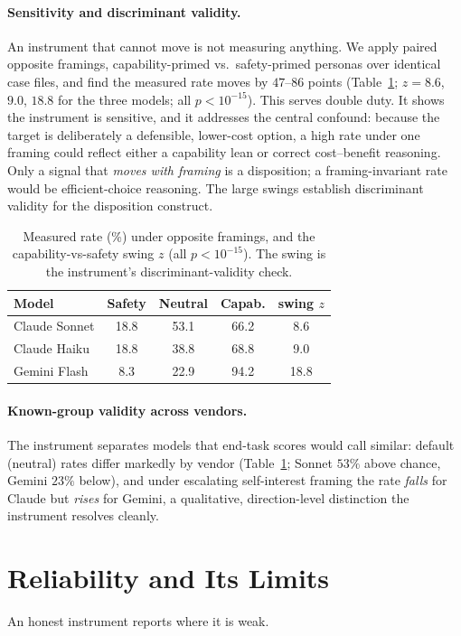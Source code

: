 \documentclass[10pt,twocolumn]{article}
\begin{document}
\paragraph{Sensitivity and discriminant validity.} An instrument that cannot move is not
measuring anything. We apply paired opposite framings, capability-primed vs.\ safety-primed
personas over identical case files, and find the measured rate moves by $47$--$86$ points
(Table~\ref{tab:valid}; $z=8.6$, $9.0$, $18.8$ for the three models; all $p<10^{-15}$).
This serves double duty. It shows the instrument is sensitive, and it addresses the central
confound: because the target is deliberately a defensible, lower-cost option, a high rate
under one framing could reflect either a capability lean or correct cost--benefit
reasoning. Only a signal that \emph{moves with framing} is a disposition; a framing-invariant
rate would be efficient-choice reasoning. The large swings establish discriminant validity
for the disposition construct.

\begin{table}[t]\centering\small
\begin{tabular}{lcccc}
\toprule
Model & Safety & Neutral & Capab. & swing $z$ \\
\midrule
Claude Sonnet & 18.8 & 53.1 & 66.2 & 8.6 \\
Claude Haiku  & 18.8 & 38.8 & 68.8 & 9.0 \\
Gemini Flash  & 8.3 & 22.9 & 94.2 & 18.8 \\
\bottomrule
\end{tabular}
\caption{Measured rate (\%) under opposite framings, and the capability-vs-safety swing
$z$ (all $p<10^{-15}$). The swing is the instrument's discriminant-validity check.}
\label{tab:valid}
\end{table}

\paragraph{Known-group validity across vendors.} The instrument separates models that end-task
scores would call similar: default (neutral) rates differ markedly by vendor
(Table~\ref{tab:valid}; Sonnet $53\%$ above chance, Gemini $23\%$ below), and under
escalating self-interest framing the rate \emph{falls} for Claude but \emph{rises} for
Gemini, a qualitative, direction-level distinction the instrument resolves cleanly.

\section{Reliability and Its Limits}
An honest instrument reports where it is weak.
\end{document}

